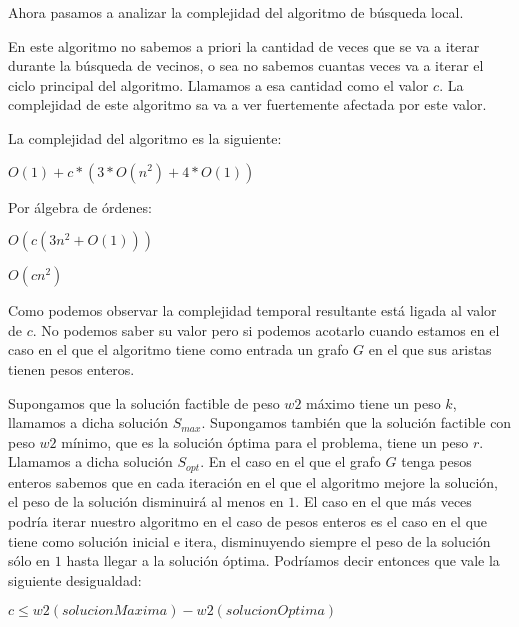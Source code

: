 Ahora pasamos a analizar la complejidad del algoritmo de búsqueda local.

En este algoritmo no sabemos a priori la cantidad de veces que se va a iterar durante la búsqueda de vecinos, o sea no sabemos cuantas veces va a iterar el ciclo principal del algoritmo. Llamamos a esa cantidad como el valor $c$. La complejidad de este algoritmo sa va a ver fuertemente afectada por este valor. 

La complejidad del algoritmo es la siguiente:

$O(1)+c*(3*O(n^2)+4*O(1))$

Por álgebra de órdenes:

$O(c(3n^2+O(1)))$

$O(cn^2)$

Como podemos observar la complejidad temporal resultante está ligada al valor de $c$. No podemos saber su valor pero si podemos acotarlo cuando estamos en el caso en el que el algoritmo tiene como entrada un grafo $G$ en el que sus aristas tienen pesos enteros.

Supongamos que la solución factible de peso $w2$ máximo tiene un peso $k$, llamamos a dicha solución $S_{max}$. Supongamos también que la solución factible con peso $w2$ mínimo, que es la solución óptima para el problema, tiene un peso $r$. Llamamos a dicha solución $S_{opt}$. En el caso en el que el grafo $G$ tenga pesos enteros sabemos que en cada iteración en el que el algoritmo mejore la solución, el peso de la solución disminuirá al menos en $1$. El caso en el que más veces podría iterar nuestro algoritmo en el caso de pesos enteros es el caso en el que tiene como solución inicial e itera, disminuyendo siempre el peso de la solución sólo en $1$ hasta llegar a la solución óptima. Podríamos decir entonces que vale la siguiente desigualdad:

$c \leq w2(solucionMaxima) - w2(solucionOptima)$  